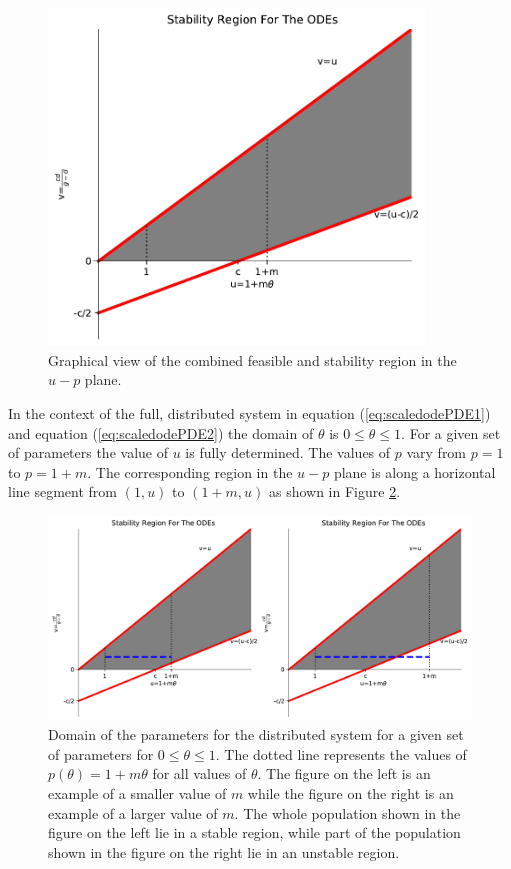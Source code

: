 \documentclass[12pt]{article}
\begin{document}
\begin{figure}[htb]
  \centering
  \includegraphics[width=10cm]{img/odeStability-uv-plane.pdf}
  \caption[Stability region in the $u-p$ plane.]{Graphical view of the
    combined feasible and stability region in the $u-p$ plane.}
  \label{fig:uvStabilityRegion}
\end{figure}

In the context of the full, distributed system in equation
(\ref{eq:scaledodePDE1}) and equation (\ref{eq:scaledodePDE2}) the
domain of $\theta$ is $0\leq\theta\leq 1$. For a given set of
parameters the value of $u$ is fully determined. The values of $p$
vary from $p=1$ to $p=1+m$.  The corresponding region in the $u-p$
plane is along a horizontal line segment from $(1,u)$ to
$(1+m,u)$ as shown in Figure \ref{fig:distributedLineSegment}.

\begin{figure}[htb]
  \centering
  \includegraphics[width=12cm]{img/odeStability-uv-plane-Line.pdf}
  \caption[Domain of the distributed system in the $u-p$
  plane.]{Domain of the parameters for the distributed system for a
    given set of parameters for $0\leq\theta\leq 1$. The dotted line
    represents the values of $p(\theta)=1+m\theta$ for all
    values of $\theta$. The figure on the left is an example of a
    smaller value of $m$ while the figure on the right is an example
    of a larger value of $m$. The whole population shown in the figure
    on the left lie in a stable region, while part of the population
    shown in the figure on the right lie in an unstable region.}
  \label{fig:distributedLineSegment}
\end{figure}
\end{document}
